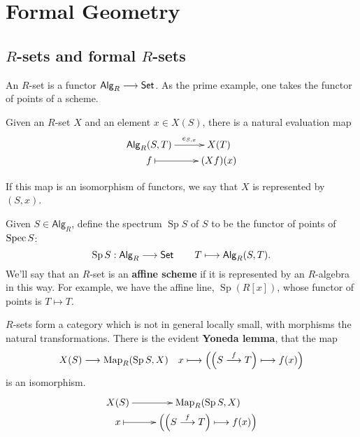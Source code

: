 \documentclass[11pt]{article}
\newcommand{\Ralg}{\mathsf{Alg}_R}
\DeclareMathOperator{\SPec}{Sp}
\begin{document}
\section{Formal Geometry}
\subsection{$R$-sets and formal $R$-sets}
\begin{itemise}
\item An $R$-set is a functor $\Ralg\to\Set$. As the prime example, one takes the functor of points of a scheme.
\item Given an $R$-set $X$ and an element $x\in X(S)$, there is a natural evaluation map
\[\xymatrix@R=0mm{
\ar[r]^-{e_{S,x}}%
\Ralg(S,T)&%
X(T)\\%
f%
\ar@{|->}[r]&
(Xf)(x)%
}\]

If this map is an isomorphism of functors, we say that $X$ is represented by $(S,x)$.
\item Given $S\in\Ralg$, define the spectrum $\SPec S$ of $S$ to be the functor of points of $\operatorname{Spec} S$:
\[\SPec S:\Ralg\to\Set\qquad T\mapsto \Ralg(S,T).\]
We'll say that an $R$-set is an \textbf{affine scheme} if it is represented by an $R$-algebra in this way. For example, we have the affine line, $\SPec(R[x])$, whose functor of points is $T\mapsto T$.
\item $R$-sets form a category which is not in general locally small, with morphisms the natural transformations. There is the evident \textbf{Yoneda lemma}, that the map
\[X(S)\to\Map_R(\SPec S,X)\quad x\mapsto \left(\left(S\overset{f}{\to}T\right)\mapsto f(x)\right)\]
is an isomorphism.
\[\xymatrix@R=0mm{
\ar[r]^-{}%
X(S)&%
\Map_R(\SPec S,X)\\%
x%
\ar@{|->}[r]&
\left(\left(S\overset{f}{\to}T\right)\mapsto f(x)\right)%
}\]

\end{itemise}
\end{document}
